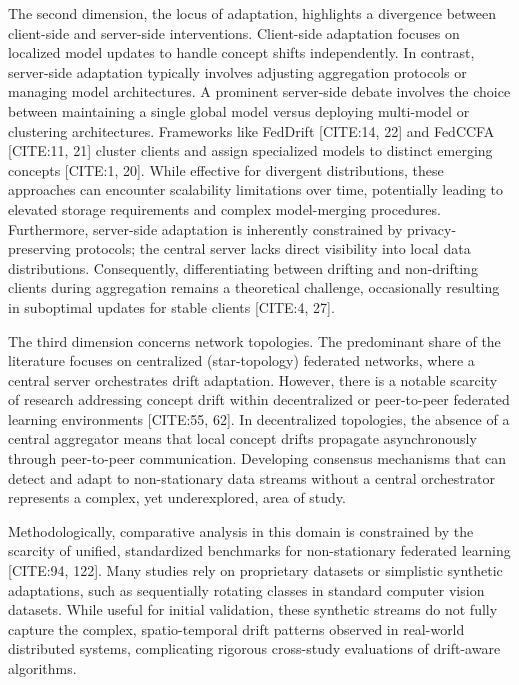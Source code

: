 \documentclass[journal]{IEEEtran}
\begin{document}
The second dimension, the locus of adaptation, highlights a divergence between client-side and server-side interventions. Client-side adaptation focuses on localized model updates to handle concept shifts independently. In contrast, server-side adaptation typically involves adjusting aggregation protocols or managing model architectures. A prominent server-side debate involves the choice between maintaining a single global model versus deploying multi-model or clustering architectures. Frameworks like FedDrift [CITE:14, 22] and FedCCFA [CITE:11, 21] cluster clients and assign specialized models to distinct emerging concepts [CITE:1, 20]. While effective for divergent distributions, these approaches can encounter scalability limitations over time, potentially leading to elevated storage requirements and complex model-merging procedures. Furthermore, server-side adaptation is inherently constrained by privacy-preserving protocols; the central server lacks direct visibility into local data distributions. Consequently, differentiating between drifting and non-drifting clients during aggregation remains a theoretical challenge, occasionally resulting in suboptimal updates for stable clients [CITE:4, 27].

The third dimension concerns network topologies. The predominant share of the literature focuses on centralized (star-topology) federated networks, where a central server orchestrates drift adaptation. However, there is a notable scarcity of research addressing concept drift within decentralized or peer-to-peer federated learning environments [CITE:55, 62]. In decentralized topologies, the absence of a central aggregator means that local concept drifts propagate asynchronously through peer-to-peer communication. Developing consensus mechanisms that can detect and adapt to non-stationary data streams without a central orchestrator represents a complex, yet underexplored, area of study.

Methodologically, comparative analysis in this domain is constrained by the scarcity of unified, standardized benchmarks for non-stationary federated learning [CITE:94, 122]. Many studies rely on proprietary datasets or simplistic synthetic adaptations, such as sequentially rotating classes in standard computer vision datasets. While useful for initial validation, these synthetic streams do not fully capture the complex, spatio-temporal drift patterns observed in real-world distributed systems, complicating rigorous cross-study evaluations of drift-aware algorithms.
\end{document}
